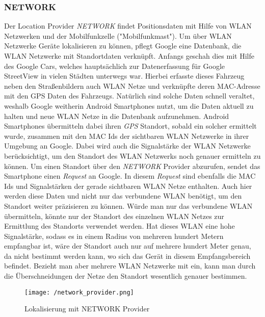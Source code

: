 \subsubsection{NETWORK}
Der Location Provider \textit{NETWORK} findet Positionsdaten mit Hilfe von WLAN Netzwerken und der Mobilfunkzelle ("Mobilfunkmast"). 
Um über WLAN Netzwerke Geräte lokalisieren zu können, pflegt Google eine Datenbank, die WLAN Netzwerke mit Standortdaten verknüpft.
Anfangs geschah dies mit Hilfe des Google Cars, welches hauptsächlich zur Datenerfassung für Google StreetView in vielen Städten unterwegs war. Hierbei erfasste dieses Fahrzeug neben den Straßenbildern auch WLAN Netze und verknüpfte deren MAC-Adresse mit den GPS Daten des Fahrzeugs.
Natürlich sind solche Daten schnell veraltet, weshalb Google weitherin Android Smartphones nutzt, um die Daten aktuell zu halten und neue WLAN Netze in die Datenbank aufzunehmen.
Android Smartphones übermitteln dabei ihren \textit{GPS} Standort, sobald ein solcher ermittelt wurde, zusammen mit den MAC Ids der sichtbaren WLAN Netzwerke in ihrer Umgebung an Google. Dabei wird auch die Signalstärke der WLAN Netzwerke berücksichtigt, um den Standort des WLAN Netzwerks noch genauer ermitteln zu können.
Um einen Standort über den \textit{NETWORK} Provider abzurufen, sendet das Smartphone einen \textit{Request} an Google. In diesem \textit{Request} sind ebenfalls die MAC Ids und Signalstärken der gerade sichtbaren WLAN Netze enthalten. Auch hier werden diese Daten und nicht nur das verbundene WLAN benötigt, um den Standort weiter präzisieren zu können. Würde man nur das verbundene WLAN übermitteln, könnte nur der Standort des einzelnen WLAN Netzes zur Ermittlung des Standorts verwendet werden. Hat dieses WLAN eine hohe Signalstärke, sodass es in einem Radius von mehreren hundert Metern empfangbar ist, wäre der Standort auch nur auf mehrere hundert Meter genau, da nicht bestimmt werden kann, wo sich das Gerät in diesem Empfangsbereich befindet. Bezieht man aber mehrere WLAN Netzwerke mit ein, kann man durch die Überschneidungen der Netze den Standort wesentlich genauer bestimmen. 

\begin{figure}[H]
	\centering
	\texttt{[image: /network\_provider.png]}
	\caption[Lokalisierung: Lokalisierung mit NETWORK Provider]{Lokalisierung mit NETWORK Provider}
	\label{fig:networkProviderfunc}
\end{figure}

